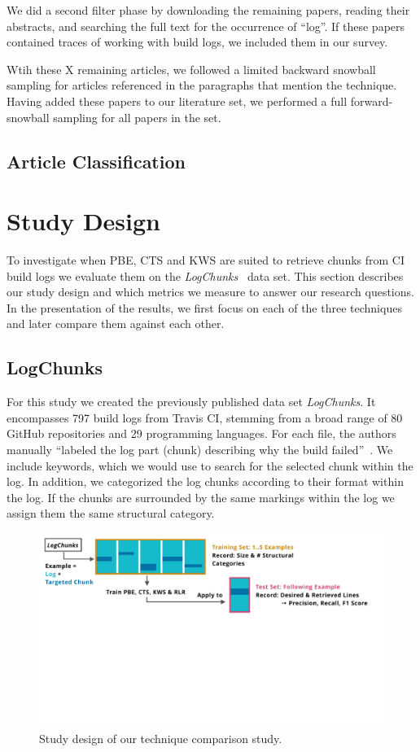 We did a second filter phase by downloading the remaining papers,
reading their abstracts, and searching the full text for the
occurrence of ``log''. If these papers contained traces of working
with build logs, we included them in our survey.

Wtih these X remaining articles, we followed a limited backward
snowball sampling for articles referenced in the paragraphs that
mention the technique. Having added these papers to our literature
set, we performed a full forward-snowball sampling for all papers in
the set.

\subsection{Article Classification}

\section{Study Design}
\label{sec:study}
To investigate when PBE, CTS and KWS are suited to retrieve chunks from CI build
logs we evaluate them on the \emph{LogChunks}~\cite{brandt2020logchunks} data set.
This section describes our study design and which metrics we measure to answer our research questions.
In the presentation of the results, we first focus on each of the three techniques and later compare them against each other.

\subsection{LogChunks}
For this study we created the previously published data set \emph{LogChunks}.
It encompasses 797 build logs from Travis CI, stemming from a broad range of 80
GitHub repositories and 29 programming languages. For each file, the authors
manually ``labeled the log part (chunk) describing why the build failed''~\cite{brandt2020logchunks}.
We include keywords, which we would use to search for the selected chunk
within the log. In addition, we categorized the log chunks according to their
format within the log. If the chunks are surrounded by the same markings within
the log we assign them the same structural category.

\begin{figure}[!t]
	\centering
	\includegraphics[width=\textwidth, trim={0.4cm 8.4cm 1.2cm 0.3cm}, clip]{img/study.pdf}
	\caption{Study design of our technique comparison study.}
	\label{fig:study}
\end{figure}


